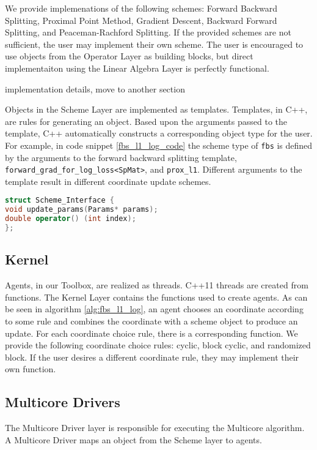 We provide implemenations of the following schemes: Forward Backward Splitting, Proximal Point Method,  Gradient Descent, Backward Forward Splitting, and Peaceman-Rachford Splitting.
If the provided schemes are not sufficient, the user may implement their own scheme.
The user is encouraged to use objects from the Operator Layer as building blocks, but direct implementaiton using the Linear Algebra Layer is perfectly functional.



{\color{red} implementation details, move to another section}

Objects in the Scheme Layer are implemented as templates.
Templates, in C++, are rules for generating an object.
Based upon the arguments passed to the template, C++ automatically constructs a corresponding object type for the user.
For example, in code snippet \ref{fbs_l1_log_code} the scheme type of \texttt{fbs} is defined by the arguments to the forward backward splitting template, \texttt{forward\_grad\_for\_log\_loss<SpMat>}, and \texttt{prox\_l1}. 
Different arguments to the template result in different coordinate update schemes.


\begin{lstlisting}[language=C++]
struct Scheme_Interface {
void update_params(Params* params);
double operator() (int index);
};
\end{lstlisting}

\subsection{Kernel}

Agents, in our Toolbox, are realized as threads. 
C++11 threads are created from functions.
The Kernel Layer contains the functions used to create agents. 
As can be seen in algorithm \ref{alg:fbs_l1_log}, 
an agent chooses an coordinate according to some rule and combines the coordinate with a scheme object to produce an update.
For each coordinate choice rule, there is a corresponding function.
We provide the following coordinate choice rules: cyclic, block cyclic, and randomized block. 
If the user desires a different coordinate rule, they may implement their own function. 

\subsection{Multicore Drivers}

The Multicore Driver layer is responsible for executing the Multicore algorithm. A Multicore Driver maps an object from the Scheme layer to agents.

